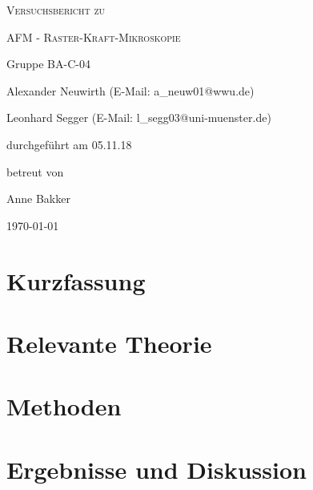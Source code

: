 \documentclass[
	a4paper,
	12pt,
	pagesize,
	ngerman
]{scrartcl}
\begin{document}
	
	\begin{titlepage}
		\centering
		{\scshape\LARGE Versuchsbericht zu \par}
		\vspace{1cm}
		{\scshape\huge AFM - Raster-Kraft-Mikroskopie \par}
		\vspace{2.5cm}
		{\LARGE Gruppe BA-C-04 \par}
		\vspace{0.5cm}
		
		{\large Alexander Neuwirth (E-Mail: a\_neuw01@wwu.de) \par}
		{\large Leonhard Segger (E-Mail: l\_segg03@uni-muenster.de) \par}
		\vfill
		
		durchgeführt am 05.11.18\par
		betreut von\par
		{\large Anne Bakker}
		
		\vfill
		
		{\large \today\par}
	\end{titlepage}
	\tableofcontents
	\newpage


	\section{Kurzfassung}
	
	\section{Relevante Theorie}
	
	\section{Methoden}
	
	\section{Ergebnisse und Diskussion}
	
\end{document}
